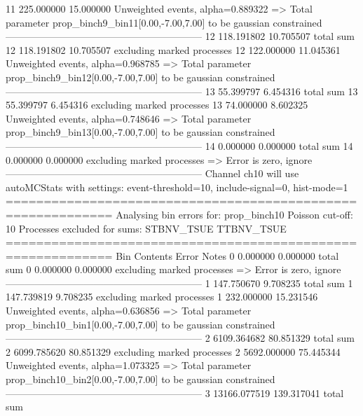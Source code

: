11         225.000000      15.000000       Unweighted events, alpha=0.889322
  => Total parameter prop_binch9_bin11[0.00,-7.00,7.00] to be gaussian constrained
------------------------------------------------------------
12         118.191802      10.705507       total sum                     
12         118.191802      10.705507       excluding marked processes    
12         122.000000      11.045361       Unweighted events, alpha=0.968785
  => Total parameter prop_binch9_bin12[0.00,-7.00,7.00] to be gaussian constrained
------------------------------------------------------------
13         55.399797       6.454316        total sum                     
13         55.399797       6.454316        excluding marked processes    
13         74.000000       8.602325        Unweighted events, alpha=0.748646
  => Total parameter prop_binch9_bin13[0.00,-7.00,7.00] to be gaussian constrained
------------------------------------------------------------
14         0.000000        0.000000        total sum                     
14         0.000000        0.000000        excluding marked processes    
  => Error is zero, ignore      
------------------------------------------------------------
Channel ch10 will use autoMCStats with settings: event-threshold=10, include-signal=0, hist-mode=1
============================================================
Analysing bin errors for: prop_binch10
Poisson cut-off: 10
Processes excluded for sums: STBNV_TSUE TTBNV_TSUE
============================================================
Bin        Contents        Error           Notes                         
0          0.000000        0.000000        total sum                     
0          0.000000        0.000000        excluding marked processes    
  => Error is zero, ignore      
------------------------------------------------------------
1          147.750670      9.708235        total sum                     
1          147.739819      9.708235        excluding marked processes    
1          232.000000      15.231546       Unweighted events, alpha=0.636856
  => Total parameter prop_binch10_bin1[0.00,-7.00,7.00] to be gaussian constrained
------------------------------------------------------------
2          6109.364682     80.851329       total sum                     
2          6099.785620     80.851329       excluding marked processes    
2          5692.000000     75.445344       Unweighted events, alpha=1.073325
  => Total parameter prop_binch10_bin2[0.00,-7.00,7.00] to be gaussian constrained
------------------------------------------------------------
3          13166.077519    139.317041      total sum                     
